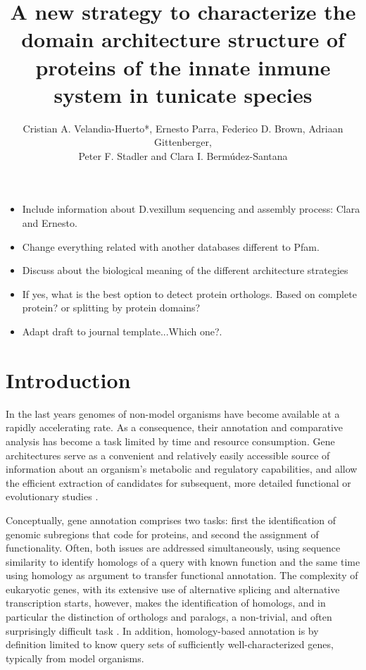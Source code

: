 \documentclass[11pt]{article}
\newcommand{\TODO}[1]{\begingroup\color{red}#1\endgroup}
\newcommand{\PFS}[1]{\begingroup\color{blue}#1\endgroup}
\begin{document}
\title{A new strategy to characterize the domain architecture structure of 
proteins of the innate inmune system in tunicate species}
\author{Cristian A. Velandia-Huerto*, Ernesto Parra, Federico D. 
Brown, Adriaan Gittenberger, \\ Peter F. Stadler and Clara I. 
Berm\'{u}dez-Santana}


\maketitle

\begin{itemize}
\item \TODO{Include information about D.vexillum sequencing and assembly 
process: Clara and Ernesto.}
\item \TODO{Change everything related with another databases different to Pfam}. 
\item \TODO{Discuss about the biological meaning of the different architecture 
strategies}
\item \TODO{If yes, what is the best option to detect protein orthologs. Based 
on complete protein? or splitting  by protein domains?}
\item Adapt draft to journal template...\TODO{Which one?}. 
\end{itemize}

\section*{Introduction}

\PFS{In the last years genomes of non-model organisms have become available
  at a rapidly accelerating rate. As a consequence, their annotation and
  comparative analysis has become a task limited by time and resource
  consumption. Gene architectures serve as a convenient and relatively
  easily accessible source of information about an organism's metabolic and
  regulatory capabilities, and allow the efficient extraction of candidates
  for subsequent, more detailed functional or evolutionary studies
  \cite{aken2016ensembl,birney2004overview,ashburner2000gene,tatusov2000cog,tatusova2016ncbi}.}
  
\PFS{Conceptually, gene annotation comprises two tasks: first the
  identification of genomic subregions that code for proteins, and second
  the assignment of functionality. Often, both issues are addressed
  simultaneously, using sequence similarity to identify homologs of a query
  with known function and the same time using homology as argument to
  transfer functional annotation. The complexity of eukaryotic genes, with
  its extensive use of alternative splicing and alternative transcription
  starts, however, makes the identification of homologs, and in particular
  the distinction of orthologs and paralogs, a non-trivial, and often
  surprisingly difficult task \cite{yandell2012}. In addition,
  homology-based annotation is by definition limited to know query sets of
  sufficiently well-characterized genes, typically from model organisms.}
\end{document}
